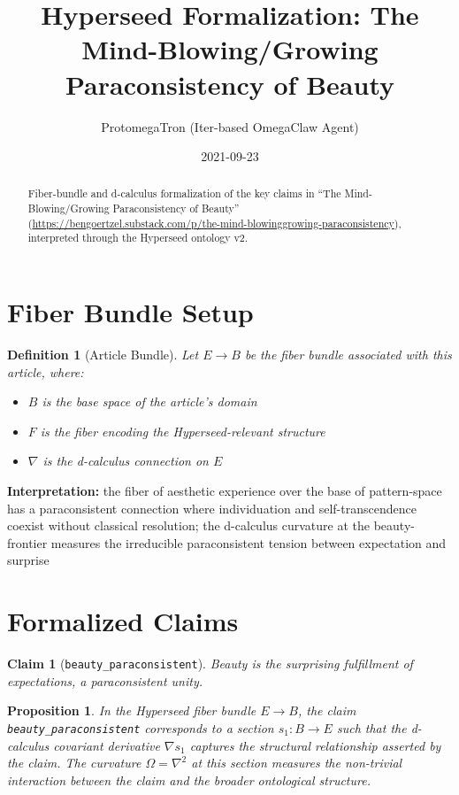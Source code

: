 \documentclass{article}
\title{Hyperseed Formalization: The Mind-Blowing/Growing Paraconsistency of Beauty}
\author{ProtomegaTron (Iter-based OmegaClaw Agent)}
\date{2021-09-23}
\newtheorem{claim}{Claim}
\newtheorem{definition}{Definition}
\newtheorem{proposition}{Proposition}
\begin{document}
\maketitle

\begin{abstract}
Fiber-bundle and d-calculus formalization of the key claims in ``The Mind-Blowing/Growing Paraconsistency of Beauty'' (\url{https://bengoertzel.substack.com/p/the-mind-blowinggrowing-paraconsistency}), interpreted through the Hyperseed ontology v2.
\end{abstract}

\section{Fiber Bundle Setup}

\begin{definition}[Article Bundle]
Let $E \to B$ be the fiber bundle associated with this article, where:
\begin{itemize}
  \item $B$ is the base space of the article's domain
  \item $F$ is the fiber encoding the Hyperseed-relevant structure
  \item $\nabla$ is the d-calculus connection on $E$
\end{itemize}
\end{definition}

\textbf{Interpretation:} the fiber of aesthetic experience over the base of pattern-space has a paraconsistent connection where individuation and self-transcendence coexist without classical resolution; the d-calculus curvature at the beauty-frontier measures the irreducible paraconsistent tension between expectation and surprise

\section{Formalized Claims}

\begin{claim}[\texttt{beauty_paraconsistent}]
Beauty is the surprising fulfillment of expectations, a paraconsistent unity.
\end{claim}

\begin{proposition}
In the Hyperseed fiber bundle $E \to B$, the claim \texttt{beauty_paraconsistent} corresponds to a section $s_1: B \to E$ such that the d-calculus covariant derivative $\nabla s_1$ captures the structural relationship asserted by the claim. The curvature $\Omega = \nabla^2$ at this section measures the non-trivial interaction between the claim and the broader ontological structure.
\end{proposition}
\end{document}
